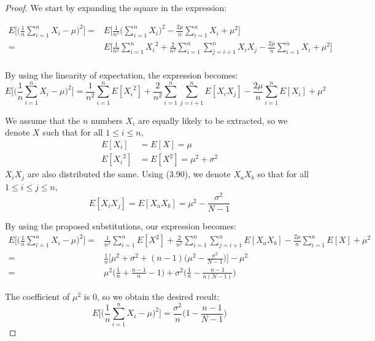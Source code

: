 \begin{proof}
    We start by expanding the square in the expression:

    \begin{align*}
        E\bigg[\bigg(\frac{1}{n}\sum_{i = 1}^n X_i - \mu\bigg)^2\bigg]
        =& E\bigg[\frac{1}{n^2}\bigg(\sum_{i = 1}^n X_i\bigg)^2 
                              - \frac{2\mu}{n}\sum_{i = 1}^n X_i + \mu^2\bigg] \\
        =& E\bigg[\frac{1}{n^2}\sum_{i = 1}^{n} {X_i}^2 + \frac{2}{n^2}\sum_{i = 1}^n\sum_{j = i + 1}^n X_iX_j
                              - \frac{2\mu}{n}\sum_{i = 1}^n X_i + \mu^2\bigg] \\
    \end{align*}

    By using the linearity of expectation, the expression becomes:
    \[
        E\bigg[\bigg(\frac{1}{n}\sum_{i = 1}^n X_i - \mu\bigg)^2\bigg] =
        \frac{1}{n^2}\sum_{i = 1}^nE[{X_i}^2] + \frac{2}{n^2}\sum_{i = 1}^n\sum_{j = i + 1}^n E[X_iX_j]
        - \frac{2\mu}{n} \sum_{i = 1}^n E[X_i] + \mu^2
    \] 

    We assume that the $n$ numbers $X_i$ are equally likely to be extracted, so
    we denote $X$ such that for all $1 \leq i \leq n$,
    \begin{align*}
        E[X_i] &= E[X] = \mu \\
        E[{X_i}^2] &= E[X^2] = \mu^2 + \sigma^2
    \end{align*}
    $X_iX_j$ are also distributed the same. Using (3.90), we denote $X_aX_b$ so that 
    for all $1 \leq i \leq j \leq n$,
    \[
        E[X_iX_j] = E[X_aX_b] = \mu^2 - \frac{\sigma^2}{N - 1}
    \] 

    By using the proposed substitutions, our expression becomes:
    \begin{align*}
        E\bigg[\bigg(\frac{1}{n}\sum_{i = 1}^n X_i - \mu\bigg)^2\bigg]
        =& \frac{1}{n^2}\sum_{i = 1}^nE[{X}^2] + \frac{2}{n^2}\sum_{i = 1}^n\sum_{j = i + 1}^n E[X_aX_b]
            - \frac{2\mu}{n} \sum_{i = 1}^n E[X] + \mu^2 \\
        =& \frac{1}{n}\bigg[\mu^2 + \sigma^2 + (n - 1) 
            \bigg(\mu^2 - \frac{\sigma^2}{N - 1}\bigg)\bigg] - \mu^2 \\
        =& \mu^2 \bigg(\frac{1}{n} + \frac{n-1}{n} - 1\bigg) + 
            \sigma^2\bigg(\frac{1}{n} - \frac{n-1}{n(N - 1)}\bigg) 
    \end{align*}

    The coefficient of $\mu^2$ is 0, so we obtain the desired result:
    \begin{equation*}\tag{3.91}
        E\bigg[\bigg(\frac{1}{n}\sum_{i = 1}^n X_i - \mu\bigg)^2\bigg] 
        = \frac{\sigma^2}{n}\bigg(1 - \frac{n-1}{N-1}\bigg)
    \end{equation*}
\end{proof}



